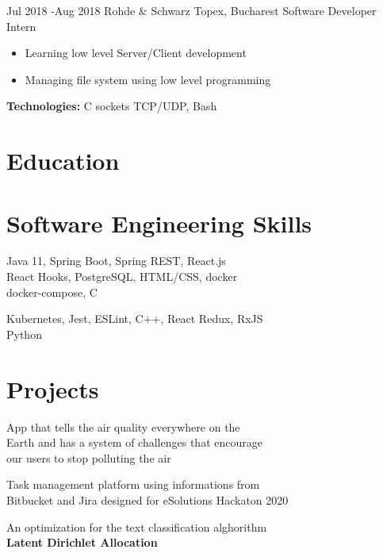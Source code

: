 \documentclass[9pt]{article}
\begin{document}
\begin{paracol}{2}
	\switchcolumn

	\job
		{Jul 2018 -}{Aug 2018}
		{Rohde \& Schwarz Topex, Bucharest}
		{Software Developer Intern}
		{  	
			\begin{itemize}
				\item Learning low level Server/Client development
				\item Managing file system using low level programming
			\end{itemize}
			\rule{0mm}{5mm}\textbf{Technologies:} C sockets TCP/UDP, Bash
	}


\section{Education}



\section{Software Engineering Skills}

	{
		Java 11, Spring Boot, Spring REST, React.js\\
		React Hooks, PostgreSQL, HTML/CSS, docker\\
		docker-compose, C
	}


	{
		Kubernetes, Jest, ESLint, C++, React Redux, RxJS\\
		Python
	}


\section{Projects}

	{
		App that tells the air quality everywhere on the\\
		Earth and has a system of challenges that encourage\\
		our users to stop polluting the air
	}

	{
		Task management platform using informations from\\ 
		Bitbucket and Jira designed for eSolutions Hackaton 2020
	}

	{
		An optimization for the text classification alghorithm \\
		\bf Latent Dirichlet Allocation
	}

\end{paracol}
\end{document}
